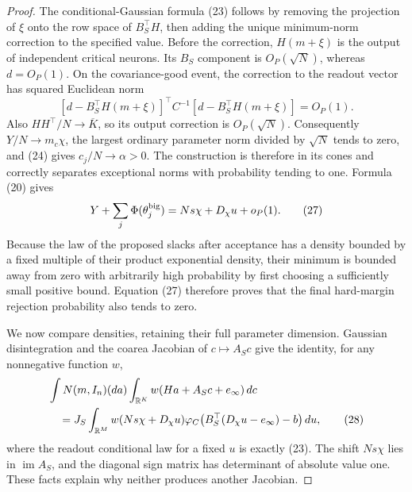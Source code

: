 \begin{proof}
The conditional-Gaussian formula (23) follows by removing the projection
of $\xi$ onto the row space of $B_S^\top H$, then adding the unique
minimum-norm correction to the specified value. Before the correction,
$H(m+\xi)$ is the output of independent critical neurons. Its
$B_S$ component is $O_P(\sqrt N)$, whereas $d=O_P(1)$.
On the covariance-good event, the correction to the readout vector has
squared Euclidean norm
\[
 [d-B_S^\top H(m+\xi)]^\top C^{-1}
 [d-B_S^\top H(m+\xi)]=O_P(1).
\]
Also $HH^\top/N\to\overline K$, so its output correction is
$O_P(\sqrt N)$. Consequently $Y/N\to m_c\chi$, the largest
ordinary parameter norm divided by $\sqrt N$ tends to zero, and
(24) gives $c_j/N\to\alpha>0$. The construction is therefore in
its cones and correctly separates exceptional norms with probability
tending to one. Formula (20) gives
\[
 Y+\sum_j\Phi(\theta_j^{\rm big})
    =Ns\chi+D_\chi u+o_P(1).                           \tag{27}
\]
Because the law of the proposed slacks after acceptance has a density
bounded by a fixed multiple of their product exponential density, their
minimum is bounded away from zero with arbitrarily high probability
by first choosing a sufficiently small positive bound. Equation (27)
therefore proves that the final hard-margin rejection probability also
tends to zero.

We now compare densities, retaining their full parameter dimension.
Gaussian disintegration and the coarea Jacobian of $c\mapsto A_Sc$
give the identity, for any nonnegative function $w$,
\begin{align*}
 &\int N(m,I_n)(da)\int_{\mathbb R^K}w(Ha+A_Sc+e_\infty)\,dc\\
 &\quad=J_S\int_{\mathbb R^M}w(Ns\chi+D_\chi u)
     \varphi_C\bigl(B_S^\top(D_\chi u-e_\infty)-b\bigr)\,du,
                                                               \tag{28}
\end{align*}
where the readout conditional law for a fixed $u$ is exactly (23).
The shift $Ns\chi$ lies in $\operatorname{im}A_S$, and the diagonal
sign matrix has determinant of absolute value one. These facts explain
why neither produces another Jacobian.


\end{proof}
